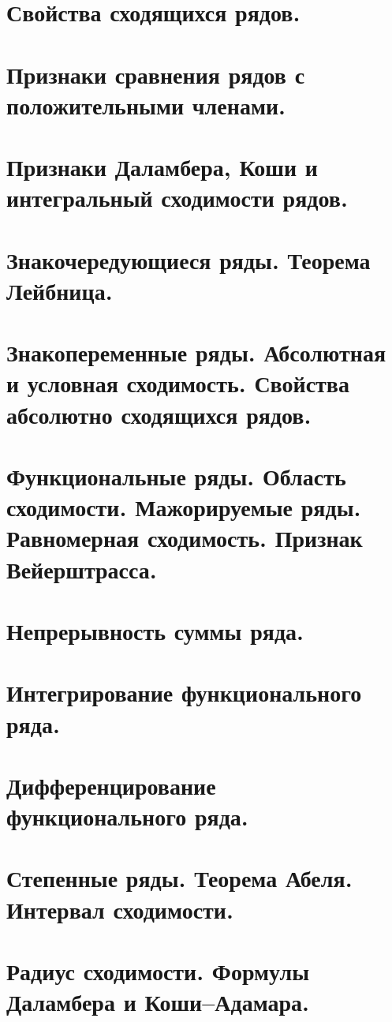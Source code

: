 \documentclass{article}
\begin{document}
\begin{sloppypar}
\section{Свойства сходящихся рядов.}

\section{Признаки сравнения рядов с положительными членами.}

\section{Признаки Даламбера, Коши и интегральный сходимости рядов.}

\section{Знакочередующиеся ряды. Теорема Лейбница.}

\section{Знакопеременные ряды. Абсолютная и условная сходимость. Свойства абсолютно сходящихся рядов.}

\section{Функциональные ряды. Область сходимости. Мажорируемые ряды. Равномерная сходимость. Признак Вейерштрасса.}

\section{Непрерывность суммы ряда.}

\section{Интегрирование функционального ряда.}

\section{Дифференцирование функционального ряда.}

\section{Степенные ряды. Теорема Абеля. Интервал сходимости.}

\section{Радиус сходимости. Формулы Даламбера и Коши–Адамара.}


\end{sloppypar}
\end{document}
